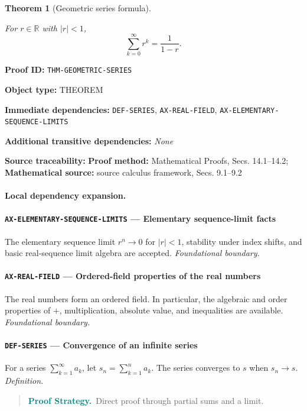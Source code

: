 \documentclass[10pt]{article}
\newcommand{\pidraw}[1]{\begingroup\urlstyle{tt}\nolinkurl{#1}\endgroup}
\newtheorem{theorem}{Theorem}[section]
\theoremstyle{definition}
\theoremstyle{remark}
\newenvironment{proofstrategy}
{\begin{quote}\small\noindent\textbf{\textcolor{teal}{Proof Strategy.}}\ }
{\end{quote}}
\newcommand{\meta}[2]{\noindent\textbf{#1:} #2\par}
\begin{document}
\begin{theorem}[Geometric series formula]\label{prf:THM-GEOMETRIC-SERIES}

For $r\in\mathbb{R}$ with $|r|<1$,
\[
\sum_{k=0}^{\infty} r^k=\frac{1}{1-r}.
\]

\end{theorem}

\meta{Proof ID}{\pidraw{THM-GEOMETRIC-SERIES}}
\meta{Object type}{THEOREM}
\meta{Immediate dependencies}{\pidraw{DEF-SERIES}, \pidraw{AX-REAL-FIELD}, \pidraw{AX-ELEMENTARY-SEQUENCE-LIMITS}}
\meta{Additional transitive dependencies}{\emph{None}}
\meta{Source traceability}{\textbf{Proof method:} Mathematical Proofs, Secs. 14.1--14.2; \textbf{Mathematical source:} source calculus framework, Secs. 9.1--9.2}

\paragraph{Local dependency expansion.}

\paragraph{\pidraw{AX-ELEMENTARY-SEQUENCE-LIMITS} --- Elementary sequence-limit facts}
The elementary sequence limit $r^n\to0$ for $|r|<1$, stability under index shifts, and basic real-sequence limit algebra are accepted.
\textit{Foundational boundary.}

\paragraph{\pidraw{AX-REAL-FIELD} --- Ordered-field properties of the real numbers}
The real numbers form an ordered field. In particular, the algebraic and order properties of $+$, multiplication, absolute value, and inequalities are available.
\textit{Foundational boundary.}

\paragraph{\pidraw{DEF-SERIES} --- Convergence of an infinite series}
For a series $\sum_{k=1}^{\infty}a_k$, let $s_n=\sum_{k=1}^n a_k$. The series converges to $s$ when $s_n\to s$.
\textit{Definition.}

\begin{proofstrategy}Direct proof through partial sums and a limit.\end{proofstrategy}
\end{document}
